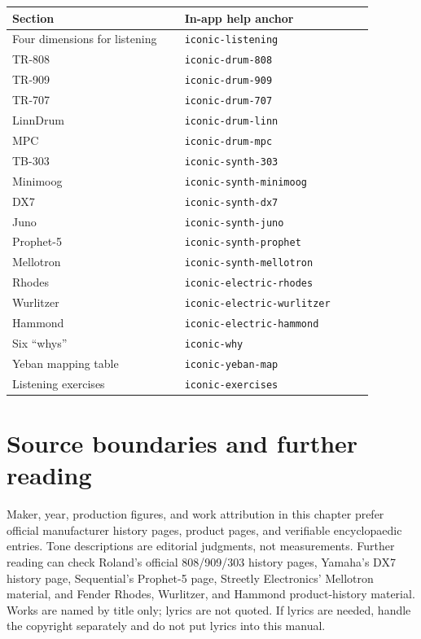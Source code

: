 \begin{longtable}{p{0.42\linewidth}p{0.46\linewidth}}
\hline
Section & In-app help anchor \\
\hline
\endhead
Four dimensions for listening & \texttt{iconic-listening} \\
TR-808 & \texttt{iconic-drum-808} \\
TR-909 & \texttt{iconic-drum-909} \\
TR-707 & \texttt{iconic-drum-707} \\
LinnDrum & \texttt{iconic-drum-linn} \\
MPC & \texttt{iconic-drum-mpc} \\
TB-303 & \texttt{iconic-synth-303} \\
Minimoog & \texttt{iconic-synth-minimoog} \\
DX7 & \texttt{iconic-synth-dx7} \\
Juno & \texttt{iconic-synth-juno} \\
Prophet-5 & \texttt{iconic-synth-prophet} \\
Mellotron & \texttt{iconic-synth-mellotron} \\
Rhodes & \texttt{iconic-electric-rhodes} \\
Wurlitzer & \texttt{iconic-electric-wurlitzer} \\
Hammond & \texttt{iconic-electric-hammond} \\
Six ``whys'' & \texttt{iconic-why} \\
Yeban mapping table & \texttt{iconic-yeban-map} \\
Listening exercises & \texttt{iconic-exercises} \\
\hline
\end{longtable}

\section{Source boundaries and further reading}
\label{sec:iconic-sources}

Maker, year, production figures, and work attribution in this chapter prefer
official manufacturer history pages, product pages, and verifiable
encyclopaedic entries. Tone descriptions are editorial judgments, not
measurements. Further reading can check Roland's official 808/909/303 history
pages, Yamaha's DX7 history page, Sequential's Prophet-5 page, Streetly
Electronics' Mellotron material, and Fender Rhodes, Wurlitzer, and Hammond
product-history material. Works are named by title only; lyrics are not quoted.
If lyrics are needed, handle the copyright separately and do not put lyrics
into this manual.

